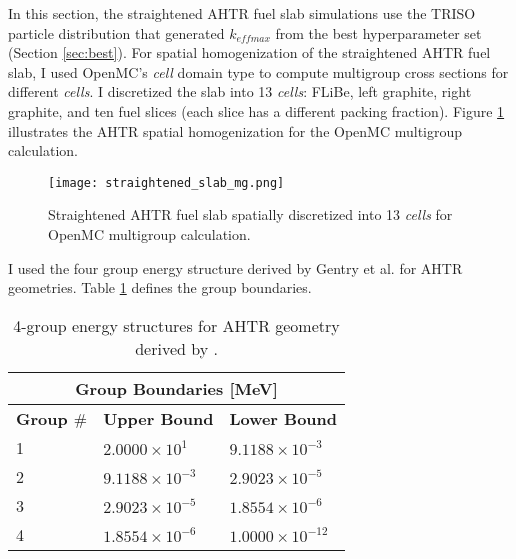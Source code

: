 In this section, the straightened AHTR fuel slab simulations use the \gls{TRISO} 
particle distribution that generated $k_{eff max}$ from the best hyperparameter 
set (Section \ref{sec:best}). 
For spatial homogenization of the straightened \gls{AHTR} fuel slab, I used 
OpenMC's \textit{cell} domain type to compute multigroup cross sections for 
different \textit{cells}. 
I discretized the slab into 13 \textit{cells}: FLiBe, left graphite, right 
graphite, and ten fuel slices (each slice has a different packing fraction). 
Figure \ref{fig:straightened_slab_mg} illustrates the \gls{AHTR} spatial 
homogenization for the OpenMC multigroup calculation. 
\begin{figure}[]
    \centering
    \texttt{[image: straightened\_slab\_mg.png]}
    \raggedright
    \caption{Straightened \acrfull{AHTR} fuel slab spatially discretized into 
    13 \textit{cells} for OpenMC multigroup calculation.}
    \label{fig:straightened_slab_mg}
\end{figure}
I used the four group energy structure derived by Gentry et al. 
\cite{gentry_development_2016} for \gls{AHTR} geometries. 
Table \ref{tab:energy_structures} defines the group boundaries. 
\begin{table}[]
    \centering
    \onehalfspacing
    \caption{4-group energy structures for \acrfull{AHTR} geometry 
    derived by \cite{gentry_development_2016}.}
	\label{tab:energy_structures}
    \footnotesize
    \begin{tabular}{lll}
    \hline
    \multicolumn{3}{c}{\textbf{Group Boundaries [MeV]}} \\ 
    \hline
    \textbf{Group $\#$}& \textbf{Upper Bound} & \textbf{Lower Bound}  \\
    \hline 
    1 & $2.0000\times 10^1$ & $9.1188\times 10^{-3}$ \\ 
    2 & $9.1188\times 10^{-3}$ & $2.9023\times 10^{-5}$\\
    3 & $2.9023\times 10^{-5}$ & $1.8554\times 10^{-6}$\\
    4 & $1.8554\times 10^{-6}$ & $1.0000\times 10^{-12}$\\
    \hline
    \end{tabular}
\end{table}

